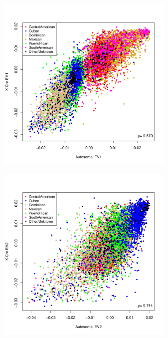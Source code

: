 \documentclass{beamer}
\begin{document}
\begin{frame}
\centering
\begin{figure}
\end{figure}
\end{frame}

\begin{frame}
\centering
\begin{figure}
\end{figure}
\end{frame}

\begin{frame}
\centering
\begin{figure}
\includegraphics[height=8.5cm]{../pca_x_auto_ev1_col.pdf}
\end{figure}
\end{frame}

\begin{frame}
\centering
\begin{figure}
\includegraphics[height=8.5cm]{../pca_x_auto_ev2_col.pdf}
\end{figure}
\end{frame}
\end{document}
